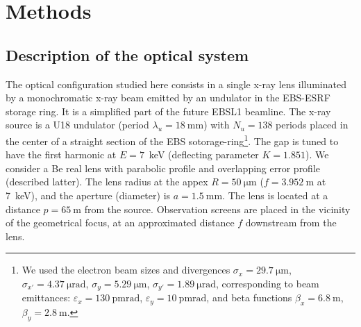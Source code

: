 \documentclass{iucr}
\begin{document}
\section{Methods}\label{sec:methods}

\subsection{Description of the optical system}\label{sec:descriptionsystem}

The optical configuration studied here consists in a single x-ray lens illuminated by a monochromatic x-ray beam emitted by an undulator in the EBS-ESRF storage ring. It is a simplified part of the future EBSL1 beamline.
The x-ray source is a U18 undulator (period $\lambda_u=\SI{18}{\milli\meter}$) with $N_u=138$ periods placed in the center of a straight section of the EBS sotorage-ring\footnote{We used the electron beam sizes and divergences $\sigma_x=\SI{29.7}{\micro\meter}$,
$\sigma_{x'}=\SI{4.37}{\micro\radian}$,
$\sigma_y=\SI{5.29}{\micro\meter}$,
$\sigma_{y'}=\SI{1.89}{\micro\radian}$, corresponding to beam emittances:  $\varepsilon_x=\SI{130}{\pico\meter \radian}$,
$\varepsilon_y=\SI{10}{\pico\meter \radian}$, and beta functions
$\beta_x=\SI{6.8}{\meter}$,
$\beta_y=\SI{2.8}{\meter}$.
}. The gap is tuned to have the first harmonic at $E=7$~keV (deflecting parameter $K=1.851$). We consider a Be real lens with parabolic profile and overlapping error profile (described latter). The lens radius at the appex $R=\SI{50}{\micro\meter}$ ($f=\SI{3.952}{\meter}$ at 7~keV), 
 and the aperture (diameter) is $a=\SI{1.5}{\milli\meter}$. The lens is located at a distance $p=\SI{65}{\meter}$ from the source. Observation screens are placed in the vicinity of the geometrical focus, at an approximated distance $f$ downstream from the lens. 
\end{document}
